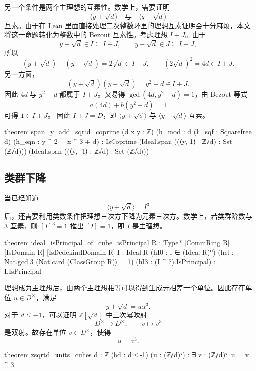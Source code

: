 另一个条件是两个主理想的互素性。数学上，需要证明
\[
\langle y+\sqrt d\rangle
\quad\text{与}\quad
\langle y-\sqrt d\rangle
\]
互素。由于在 Lean 里面直接处理二次整数环里的理想互素证明会十分麻烦，本文将这一命题转化为整数中的 Bezout 互素性。考虑理想 \(I+J\)。由于
\[
y+\sqrt d\in I\subseteq I+J,\qquad
y-\sqrt d\in J\subseteq I+J,
\]
所以
\[
(y+\sqrt d)-(y-\sqrt d)=2\sqrt d\in I+J,
\qquad
(2\sqrt d)^2=4d\in I+J.
\]
另一方面，
\[
(y+\sqrt d)(y-\sqrt d)=y^2-d\in I+J.
\]
因此 \(4d\) 与 \(y^2-d\) 都属于 \(I+J\)。又易得 \(\gcd(4d,y^2-d)=1\)，由 Bezout 等式
\[
a(4d)+b(y^2-d)=1
\]
可得 \(1\in I+J\)。
因此 \(I+J=D\)，即 \(\langle y+\sqrt d\rangle\) 与 \(\langle y-\sqrt d\rangle\) 互素。

\begin{leanlisting}
theorem span_y_add_sqrtd_coprime
    (d x y : ℤ)
    (h_mod : d %
    (h_sqf : Squarefree d)
    (h_eqn : y ^ 2 = x ^ 3 + d) :
    IsCoprime
      (Ideal.span ({(⟨y, 1⟩ : ℤ√d)} : Set (ℤ√d)))
      (Ideal.span ({(⟨y, -1⟩ : ℤ√d)} : Set (ℤ√d)))
\end{leanlisting}

\subsection{类群下降}

当已经知道
\[
\langle y+\sqrt d\rangle=I^3
\]
后，还需要利用类数条件把理想三次方下降为元素三次方。数学上，若类群阶数与 \(3\) 互素，则 \([I]^3=1\) 推出 \([I]=1\)，即 \(I\) 是主理想。

\begin{leanlisting}
theorem ideal_isPrincipal_of_cube_isPrincipal
    {R : Type*} [CommRing R] [IsDomain R] [IsDedekindDomain R]
    {I : Ideal R} (hI0 : I ∈ (Ideal R)⁰)
    (hcl : Nat.gcd 3 (Nat.card (ClassGroup R)) = 1)
    (hI3 : (I ^ 3).IsPrincipal) :
    I.IsPrincipal
\end{leanlisting}

理想成为主理想后，由两个主理想相等可以得到生成元相差一个单位。因此存在单位 \(u\in D^\times\)，满足
\[
y+\sqrt d=u\alpha^3.
\]
对于 \(d\le -1\)，可以证明 \(\mathbb Z[\sqrt d]\) 中三次幂映射
\[
D^\times\longrightarrow D^\times,\qquad v\longmapsto v^3
\]
是双射。故存在单位 \(v\in D^\times\)，使得
\[
u=v^3.
\]

\begin{leanlisting}
theorem zsqrtd_units_cubes {d : ℤ} (hd : d ≤ -1) (u : (ℤ√d)ˣ) :
    ∃ v : (ℤ√d)ˣ, u = v ^ 3
\end{leanlisting}

